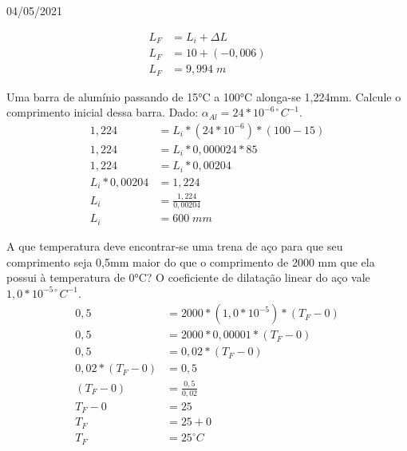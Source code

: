 \documentclass{SchoolBook}
\begin{document}
\begin{day}{04/05/2021}
\begin{enumerate}
\begin{multicols}{2}
                \begin{align*}
                     L_F &= L_i + \Delta L \\
                     L_F &= 10 + (-0,006)  \\
                     L_F &= 9,994\;m
                \end{align*}
            \end{multicols}
        \end{enumerate}
        
        Uma barra de alumínio passando de 15°C a 100°C alonga-se 1,224mm. Calcule o comprimento inicial dessa barra. Dado: $\alpha_{Al} = 24 * 10^{-6\circ}C^{-1}$.
        \begin{align*}
                    1,224 &= L_i * (24 * 10^{-6}) * (100 - 15) \\
                    1,224 &= L_i * 0,000024 * 85               \\
                    1,224 &= L_i * 0,00204                     \\
            L_i * 0,00204 &= 1,224                             \\
                      L_i &= \frac{1,224}{0,00204}             \\
                      L_i &= 600\;mm
        \end{align*}
        
        A que temperatura deve encontrar-se uma trena de aço para que seu comprimento seja 0,5mm maior do que o comprimento de 2000 mm que ela possui à temperatura de 0°C? O coeficiente de dilatação linear do aço vale $1,0 * 10^{-5\circ}C^{-1}$.
        \begin{align*}
                         0,5 &= 2000 * (1,0 * 10^{-5}) * (T_F - 0) \\
                         0,5 &= 2000 * 0,00001 * (T_F - 0)         \\
                         0,5 &= 0,02 * (T_F - 0)                   \\
            0,02 * (T_F - 0) &= 0,5                                \\
                   (T_F - 0) &= \frac{0,5}{0,02}                   \\
                     T_F - 0 &= 25                                 \\
                         T_F &= 25 + 0                             \\
                         T_F &= 25^\circ C
        \end{align*}
    \end{day}
    
\end{document}
